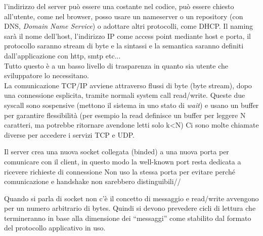 \documentclass[a4paper,12pt, oneside]{book}
\begin{document}
l'indirizzo del server può essere una costante nel codice, può essere chiesto all'utente, come nel browser, posso usare un nameserver o un repository (con DNS, \textit{Domain Name Service}) o adottare altri protocolli, come DHCP. Il naming sarà il nome dell'host, l'indirizzo IP come access point mediante host e porta, il protocollo saranno stream di byte e la sintassi e la semantica saranno definiti dall'applicazione con http, smtp etc...\\
Tutto questo è a un basso livello di trasparenza in quanto sia utente che sviluppatore lo necessitano.\\
La comunicazione TCP/IP avviene attraverso flussi di byte
(byte stream), dopo una connessione esplicita, tramite
normali system call read/write. Queste due syscall sono sospensive (mettono il sistema in uno stato di \textit{wait}) e usano un buffer per garantire flessibilità (per esempio la read definisce un buffer per leggere N caratteri, ma potrebbe ritornare avendone letti solo k<N)
Ci sono molte chiamate diverse per accedere i servizi TCP e UDP. 

Il server crea una nuova socket collegata (binded) a una
nuova porta per comunicare con il client, in questo modo la well-known port resta dedicata a ricevere richieste di connessione
Non uso la stessa porta per evitare perché comunicazione e handshake non sarebbero distinguibili//

Quando si parla di socket non c'è il concetto di messaggio e read/write avvengono per un numero arbitrario di bytes. Quindi si devono prevedere cicli di lettura che
termineranno in base alla dimensione dei “messaggi” come
stabilito dal formato del protocollo applicativo in uso. \\
\end{document}
